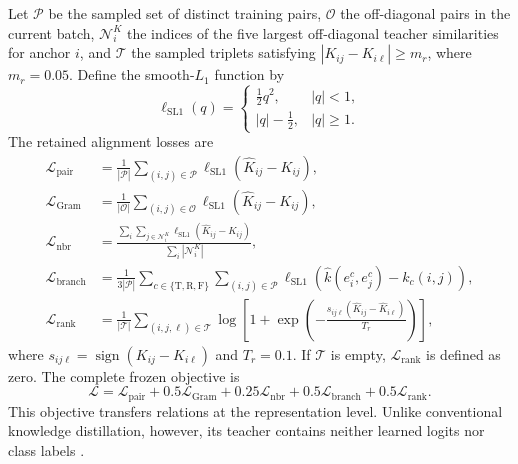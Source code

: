 \documentclass[pdflatex,sn-mathphys-num]{sn-jnl}
\newcommand{\1}{\mathbf{1}}
\theoremstyle{plain}
\begin{document}
	Let $\mathcal{P}$ be the sampled set of distinct training pairs,
	$\mathcal{O}$ the off-diagonal pairs in the current batch,
	$\mathcal{N}_i^K$ the indices of the five largest off-diagonal teacher
	similarities for anchor $i$, and $\mathcal{T}$ the sampled triplets
	satisfying $|K_{ij}-K_{i\ell}|\geq m_r$, where $m_r=0.05$. Define the smooth-$L_1$ function by
	\begin{equation}
		\ell_{\mathrm{SL1}}(q)
		=
		\begin{cases}
			\frac{1}{2}q^2, & |q|<1,\\
			|q|-\frac{1}{2}, & |q|\geq1.
		\end{cases}
		\label{eq:smoothl1}
	\end{equation}
	The retained alignment losses are
	\begin{align}
		\mathcal{L}_{\mathrm{pair}}
		&=
		\frac{1}{|\mathcal{P}|}
		\sum_{(i,j)\in\mathcal{P}}
		\ell_{\mathrm{SL1}}(\widehat K_{ij}-K_{ij}),
		\label{eq:lpair}\\
		\mathcal{L}_{\mathrm{Gram}}
		&=
		\frac{1}{|\mathcal{O}|}
		\sum_{(i,j)\in\mathcal{O}}
		\ell_{\mathrm{SL1}}(\widehat K_{ij}-K_{ij}),
		\label{eq:lgram}\\
		\mathcal{L}_{\mathrm{nbr}}
		&=
		\frac{
			\displaystyle
			\sum_i\sum_{j\in\mathcal{N}_i^K}
			\ell_{\mathrm{SL1}}(\widehat K_{ij}-K_{ij})
		}{
			\displaystyle
			\sum_i|\mathcal{N}_i^K|
		},
		\label{eq:lnbr}\\
		\mathcal{L}_{\mathrm{branch}}
		&=
		\frac{1}{3|\mathcal{P}|}
		\sum_{c\in\{\mathrm{T},\mathrm{R},\mathrm{F}\}}
		\sum_{(i,j)\in\mathcal{P}}
		\ell_{\mathrm{SL1}}
		\!\left(
		\widehat k(e_i^c,e_j^c)-k_c(i,j)
		\right),
		\label{eq:lbranch}\\
		\mathcal{L}_{\mathrm{rank}}
		&=
		\frac{1}{|\mathcal{T}|}
		\sum_{(i,j,\ell)\in\mathcal{T}}
		\log\!\left[
		1+
		\exp\!\left(
		-\frac{
			s_{ij\ell}
			(\widehat K_{ij}-\widehat K_{i\ell})
		}{T_r}
		\right)
		\right],
		\label{eq:lrank}
	\end{align}
	where $s_{ij\ell}=\operatorname{sign}(K_{ij}-K_{i\ell})$ and $T_r=0.1$.
	If $\mathcal{T}$ is empty, $\mathcal{L}_{\mathrm{rank}}$ is defined as
	zero. The complete frozen objective is
	\begin{equation}
		\mathcal{L}
		=
		\mathcal{L}_{\mathrm{pair}}
		+
		0.5\mathcal{L}_{\mathrm{Gram}}
		+
		0.25\mathcal{L}_{\mathrm{nbr}}
		+
		0.5\mathcal{L}_{\mathrm{branch}}
		+
		0.5\mathcal{L}_{\mathrm{rank}}.
		\label{eq:objective}
	\end{equation}
	This objective transfers relations at the representation level.
	Unlike conventional knowledge distillation, however, its teacher
	contains neither learned logits nor class labels \cite{park2019rkd}.
	
\end{document}
